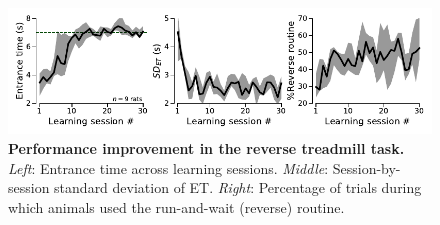 \begin{figure}[h!]
	\begin{center}
		\includegraphics[scale=1]{ch-appendicies/figures/RevTrdLearning.pdf}
		\caption[Learning the Reverse Treadmill Task]
		{\textbf{Performance improvement in the reverse treadmill task.}
		\textit{Left}: Entrance time across learning sessions.
		\textit{Middle}: Session-by-session standard deviation of ET.
		\textit{Right}: Percentage of trials during which animals used the run-and-wait (reverse) routine.
		}
		\label{fig:appendix:revLearn}
	\end{center}
\end{figure}